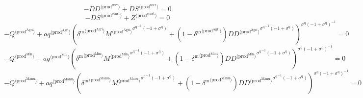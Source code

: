\begin{equation}
-{{D\!D}}^{\langle \mathrm{prod}^{\mathrm{serv}}\rangle} + {{D\!S}}^{\langle \mathrm{prod}^{\mathrm{serv}}\rangle} = 0
\end{equation}
\begin{equation}
-{{D\!S}}^{\langle \mathrm{prod}^{\mathrm{const}}\rangle} + {Z}^{\langle \mathrm{prod}^{\mathrm{const}}\rangle} = 0
\end{equation}
\begin{equation}
-{Q}^{\langle \mathrm{prod}^{\mathrm{Agri}}\rangle} + {{{a\!q}}^{\langle \mathrm{\mathrm{prod}^{\mathrm{Agri}}}\rangle}} {\left({{\delta^{\mathrm{m}}}^{\langle \mathrm{\mathrm{prod}^{\mathrm{Agri}}}\rangle}} {{{M}^{\langle \mathrm{prod}^{\mathrm{Agri}}\rangle}}^{{\sigma^{\mathrm{q}}}^{-1} \left(-1 + \sigma^{\mathrm{q}}\right)}} + \left(1 - {\delta^{\mathrm{m}}}^{\langle \mathrm{\mathrm{prod}^{\mathrm{Agri}}}\rangle}\right) {{{{D\!D}}^{\langle \mathrm{prod}^{\mathrm{Agri}}\rangle}}^{{\sigma^{\mathrm{q}}}^{-1} \left(-1 + \sigma^{\mathrm{q}}\right)}}\right)^{{\sigma^{\mathrm{q}}} \left(-1 + \sigma^{\mathrm{q}}\right)^{-1}}} = 0
\end{equation}
\begin{equation}
-{Q}^{\langle \mathrm{prod}^{\mathrm{Min}}\rangle} + {{{a\!q}}^{\langle \mathrm{\mathrm{prod}^{\mathrm{Min}}}\rangle}} {\left({{\delta^{\mathrm{m}}}^{\langle \mathrm{\mathrm{prod}^{\mathrm{Min}}}\rangle}} {{{M}^{\langle \mathrm{prod}^{\mathrm{Min}}\rangle}}^{{\sigma^{\mathrm{q}}}^{-1} \left(-1 + \sigma^{\mathrm{q}}\right)}} + \left(1 - {\delta^{\mathrm{m}}}^{\langle \mathrm{\mathrm{prod}^{\mathrm{Min}}}\rangle}\right) {{{{D\!D}}^{\langle \mathrm{prod}^{\mathrm{Min}}\rangle}}^{{\sigma^{\mathrm{q}}}^{-1} \left(-1 + \sigma^{\mathrm{q}}\right)}}\right)^{{\sigma^{\mathrm{q}}} \left(-1 + \sigma^{\mathrm{q}}\right)^{-1}}} = 0
\end{equation}
\begin{equation}
-{Q}^{\langle \mathrm{prod}^{\mathrm{Manu}}\rangle} + {{{a\!q}}^{\langle \mathrm{\mathrm{prod}^{\mathrm{Manu}}}\rangle}} {\left({{\delta^{\mathrm{m}}}^{\langle \mathrm{\mathrm{prod}^{\mathrm{Manu}}}\rangle}} {{{M}^{\langle \mathrm{prod}^{\mathrm{Manu}}\rangle}}^{{\sigma^{\mathrm{q}}}^{-1} \left(-1 + \sigma^{\mathrm{q}}\right)}} + \left(1 - {\delta^{\mathrm{m}}}^{\langle \mathrm{\mathrm{prod}^{\mathrm{Manu}}}\rangle}\right) {{{{D\!D}}^{\langle \mathrm{prod}^{\mathrm{Manu}}\rangle}}^{{\sigma^{\mathrm{q}}}^{-1} \left(-1 + \sigma^{\mathrm{q}}\right)}}\right)^{{\sigma^{\mathrm{q}}} \left(-1 + \sigma^{\mathrm{q}}\right)^{-1}}} = 0
\end{equation}

